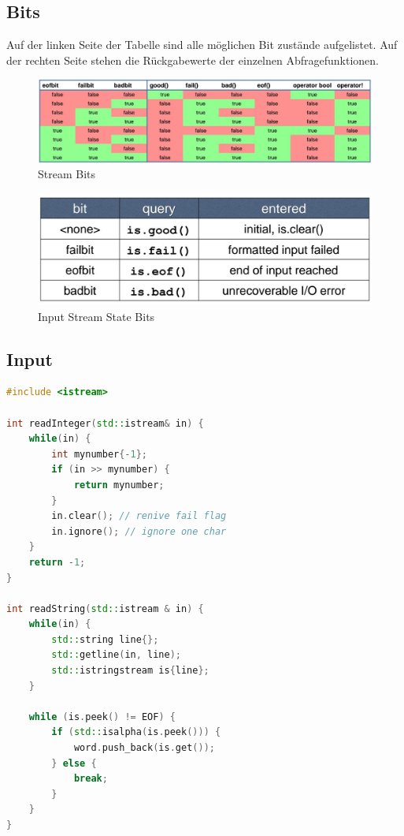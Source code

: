 \subsection{Bits}
Auf der linken Seite der Tabelle sind alle möglichen Bit zustände aufgelistet. Auf der rechten Seite stehen die Rückgabewerte der einzelnen Abfragefunktionen.
\begin{figure}[h]
\centering
\includegraphics[width=\linewidth]{images/stream_bits}
\caption{Stream Bits}
\label{fig:streambits}
\end{figure}
\begin{figure}[h]
	\centering
	\includegraphics[width=0.7\linewidth]{images/stream_state_bits}
	\caption{Input Stream State Bits}
	\label{fig:streamstatebits}
\end{figure}


\clearpage

\subsection{Input}
\begin{lstlisting}[language=C++, caption=Simple Input Stream]
#include <istream>

int readInteger(std::istream& in) {
	while(in) {
		int mynumber{-1};
		if (in >> mynumber) {
			return mynumber;
		}
		in.clear(); // renive fail flag
		in.ignore(); // ignore one char
	}
	return -1;
}

int readString(std::istream & in) {
	while(in) {
		std::string line{};
		std::getline(in, line);
		std::istringstream is{line};
	}
	
	while (is.peek() != EOF) {
		if (std::isalpha(is.peek())) {
			word.push_back(is.get());
		} else {
			break;
		}
	}
}
\end{lstlisting}



